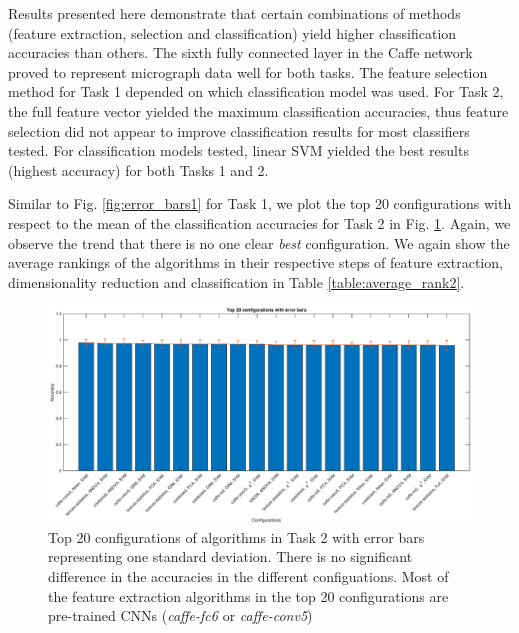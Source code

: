 
Results presented here demonstrate that certain combinations of methods (feature extraction, selection and classification) yield higher classification accuracies than others.  
The sixth fully connected layer in the Caffe network proved to represent micrograph data well for both tasks.  The feature selection method for Task 1 depended on which classification model was used.  For Task 2, the full feature vector yielded the maximum classification accuracies, thus feature selection did not appear to improve classification results for most classifiers tested.  For classification models tested, linear SVM yielded the best results (highest accuracy) for both Tasks 1 and 2.  


Similar to Fig. \ref{fig:error_bars1} for Task 1, we plot the top 20 configurations with respect to the mean of the classification accuracies for Task 2 in Fig. \ref{fig:error_bars2}. Again, we observe the trend that there is no one clear \textit{best} configuration. We again show the average rankings of the algorithms in their respective steps of feature extraction, dimensionality reduction and classification in Table \ref{table:average_rank2}. 
\begin{figure}
  \begin{centering}
 \includegraphics[scale=0.4]{img/best_trans_long_error_bars_20.eps}
 \caption{Top 20 configurations of algorithms in Task 2 with error bars representing one standard deviation. There is no significant difference in the accuracies in the different configuations. Most of the feature extraction algorithms in the top 20 configurations are pre-trained CNNs (\textit{caffe-fc6} or \textit{caffe-conv5})}
 \label{fig:error_bars2}
 \end{centering}
\end{figure}


